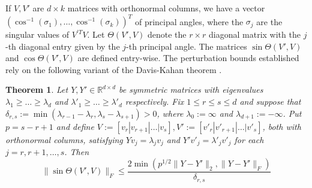 \documentclass[a4]{article}
\newtheorem{thm}{Theorem}
\newcommand{\+}[1]{\mathbf{#1}}
\newcommand{\R}{\mathbb{R}}
\newcommand{\norm}[1]{\|#1\|}
\begin{document}
If $V, V'$ are $d \times k$ matrices with orthonormal columns, we have a vector $(\cos^{-1}(\sigma_{1}), \dots, \cos^{-1}(\sigma_{k}))^{T}$ of principal angles, where the $\sigma_{j}$ are the singular values of $V^{'T}V$. Let $\Theta(V', V)$ denote the $r \times r$ diagonal matrix with the $j$-th diagonal entry given by the $j$-th principal angle. The matrices $\sin \Theta(V', V)$ and $\cos \Theta(V', V)$ are defined entry-wise. The perturbation bounds established rely on the following variant of the Davis-Kahan theorem \cite{YuusefulvariantDavis2015}.

\begin{thm} \label{thm:dk} Let $Y, Y' \in \R^{d \times d}$ be symmetric matrices with eigenvalues $\lambda_{1} \geq \dots \geq \lambda_{d}$ and $\lambda'_{1} \geq \dots \geq \lambda'_{d}$ respectively. Fix $1 \leq r \leq s \leq d$ and suppose that $\delta_{r, s} := \min(\lambda_{r - 1} - \lambda_{r}, \lambda_{s} - \lambda_{s + 1}) > 0$, where $\lambda_{0} := \infty$ and $\lambda_{d + 1} := - \infty$. Put $p = s - r + 1$ and define $V := [v_{r} | v_{r+1} | \dots | v_{s}], V' := [v'_{r} | v'_{r+1} | \dots | v'_{s}]$, both with orthonormal columns, satisfying $Yv_{j} = \lambda_{j} v_{j}$ and $Y'v'_{j} = \lambda'_{j} v'_{j}$ for each $j = r, r+1, \dots, s$. Then
\[ \norm{\sin \Theta(V', V)}_{F} \leq \frac{2 \min(p^{1/2}\norm{Y - Y'}_{2}, \norm{Y - Y'}_{F})}{\delta_{r, s}} \] 
\end{thm}
\end{document}

